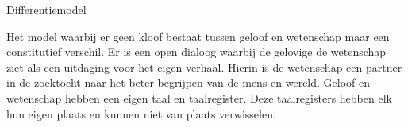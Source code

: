 \documentclass[main.tex]{subfiles}
\begin{document}
\begin{examenvraag}
    \begin{vraag}
        Differentiemodel
    \end{vraag}

    \begin{antwoord}
	Het model waarbij er geen kloof bestaat tussen geloof en wetenschap maar een constitutief 
	verschil.‭ ‬Er is een open dialoog waarbij de gelovige de wetenschap ziet als een uitdaging voor 
	het eigen verhaal.‭ ‬Hierin is de wetenschap een partner in de zoektocht naar het beter begrijpen 
	van de mens en wereld.‭ ‬Geloof en wetenschap hebben een eigen taal en taalregister.‭ ‬Deze 
	taalregisters hebben elk hun eigen plaats en kunnen niet van plaats verwisselen.‭ 
    \end{antwoord}
\end{examenvraag}
\end{document}
